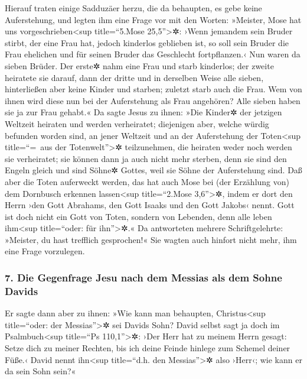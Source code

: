  Hierauf traten einige Sadduzäer herzu, die da behaupten,
es gebe keine Auferstehung, und legten ihm eine Frage vor
 mit den Worten: »Meister, Mose hat uns
vorgeschrieben\textless sup title=``5.Mose 25,5''\textgreater✲: ›Wenn
jemandem sein Bruder stirbt, der eine Frau hat, jedoch kinderlos
geblieben ist, so soll sein Bruder die Frau ehelichen und für seinen
Bruder das Geschlecht fortpflanzen.‹  Nun waren da sieben
Brüder. Der erste✲ nahm eine Frau und starb kinderlos; 
der zweite heiratete sie darauf,  dann der dritte und in
derselben Weise alle sieben, hinterließen aber keine Kinder und starben;
 zuletzt starb auch die Frau.  Wem von
ihnen wird diese nun bei der Auferstehung als Frau angehören? Alle
sieben haben sie ja zur Frau gehabt.«  Da sagte Jesus zu
ihnen: »Die Kinder✲ der jetzigen Weltzeit heiraten und werden
verheiratet;  diejenigen aber, welche würdig befunden
worden sind, an jener Weltzeit und an der Auferstehung der
Toten\textless sup title=``=~aus der Totenwelt''\textgreater✲
teilzunehmen, die heiraten weder noch werden sie verheiratet;
 sie können dann ja auch nicht mehr sterben, denn sie
sind den Engeln gleich und sind Söhne✲ Gottes, weil sie Söhne der
Auferstehung sind.  Daß aber die Toten auferweckt werden,
das hat auch Mose bei (der Erzählung von) dem Dornbusch erkennen
lassen\textless sup title=``2.Mose 3,6''\textgreater✲, indem er dort den
Herrn ›den Gott Abrahams, den Gott Isaaks und den Gott Jakobs‹ nennt.
 Gott ist doch nicht ein Gott von Toten, sondern von
Lebenden, denn alle leben ihm\textless sup title=``oder: für
ihn''\textgreater✲.«  Da antworteten mehrere
Schriftgelehrte: »Meister, du hast trefflich gesprochen!«
 Sie wagten auch hinfort nicht mehr, ihm eine Frage
vorzulegen.

\hypertarget{die-gegenfrage-jesu-nach-dem-messias-als-dem-sohne-davids}{%
\subsubsection{7. Die Gegenfrage Jesu nach dem Messias als dem Sohne
Davids}\label{die-gegenfrage-jesu-nach-dem-messias-als-dem-sohne-davids}}

 Er sagte dann aber zu ihnen: »Wie kann man behaupten,
Christus\textless sup title=``oder: der Messias''\textgreater✲ sei
Davids Sohn?  David selbst sagt ja doch im
Psalmbuch\textless sup title=``Ps 110,1''\textgreater✲: ›Der Herr hat zu
meinem Herrn gesagt: Setze dich zu meiner Rechten,  bis
ich deine Feinde hinlege zum Schemel deiner Füße.‹  David
nennt ihn\textless sup title=``d.h. den Messias''\textgreater✲ also
›Herr‹; wie kann er da sein Sohn sein?«


